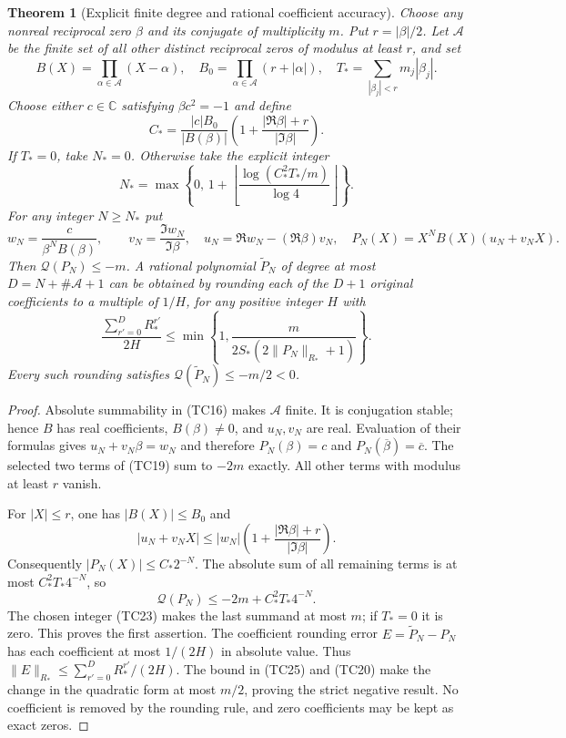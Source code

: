 \documentclass[11pt]{article}
\newtheorem{theorem}{Theorem}
\newcommand{\C}{\mathbb C}
\begin{document}
\begin{theorem}[Explicit finite degree and rational coefficient accuracy]
Choose any nonreal reciprocal zero $\beta$ and its conjugate of
multiplicity $m$. Put $r=|\beta|/2$. Let $\mathcal A$ be the finite
set of all other distinct reciprocal zeros of modulus at least
$r$, and set
\[
B(X)=\prod_{\alpha\in\mathcal A}(X-\alpha),\quad
B_0=\prod_{\alpha\in\mathcal A}(r+|\alpha|),\quad
T_*=\sum_{|\beta_j|<r}m_j|\beta_j|.
\tag{TC21}
\]
Choose either $c\in\C$ satisfying $\beta c^2=-1$ and define
\[
C_*=\frac{|c|B_0}{|B(\beta)|}
\left(1+\frac{|\Re\beta|+r}{|\Im\beta|}\right).
\tag{TC22}
\]
If $T_*=0$, take $N_*=0$. Otherwise take the explicit integer
\[
N_*=\max\left\{0,\,
1+\left\lfloor\frac{\log(C_*^2T_*/m)}{\log4}\right\rfloor\right\}.
\tag{TC23}
\]
For any integer $N\ge N_*$ put
\[
w_N=\frac{c}{\beta^NB(\beta)},\qquad
v_N=\frac{\Im w_N}{\Im\beta},\quad
u_N=\Re w_N-(\Re\beta)v_N,\quad
P_N(X)=X^NB(X)(u_N+v_NX).
\tag{TC24}
\]
Then $\mathcal Q(P_N)\le-m$. A rational polynomial
$\widetilde P_N$ of degree at most
$D=N+\#\mathcal A+1$ can be obtained by rounding each of the
$D+1$ original coefficients to a multiple of $1/H$, for any
positive integer $H$ with
\[
\frac{\sum_{r'=0}^D R_*^{r'}}{2H}
\le
\min\left\{1,\frac{m}{2S_*(2\|P_N\|_{R_*}+1)}\right\}.
\tag{TC25}
\]
Every such rounding satisfies
$\mathcal Q(\widetilde P_N)\le-m/2<0$.
\end{theorem}
\begin{proof}
Absolute summability in (TC16) makes $\mathcal A$ finite.
It is conjugation stable; hence $B$ has real coefficients,
$B(\beta)\ne0$, and $u_N,v_N$ are real. Evaluation of their
formulas gives $u_N+v_N\beta=w_N$ and therefore
$P_N(\beta)=c$ and $P_N(\overline\beta)=\overline c$.
The selected two terms of (TC19) sum to $-2m$ exactly.
All other terms with modulus at least $r$ vanish.

For $|X|\le r$, one has $|B(X)|\le B_0$ and
\[
|u_N+v_NX|
\le |w_N|\left(1+\frac{|\Re\beta|+r}{|\Im\beta|}\right).
\]
Consequently $|P_N(X)|\le C_*2^{-N}$. The absolute sum of
all remaining terms is at most $C_*^2T_*4^{-N}$, so
\[
\mathcal Q(P_N)\le-2m+C_*^2T_*4^{-N}.
\tag{TC26}
\]
The chosen integer (TC23) makes the last summand at most $m$;
if $T_*=0$ it is zero. This proves the first assertion.
The coefficient rounding error $E=\widetilde P_N-P_N$ has
each coefficient at most $1/(2H)$ in absolute value.
Thus $\|E\|_{R_*}\le\sum_{r'=0}^DR_*^{r'}/(2H)$.
The bound in (TC25) and (TC20) make the change in the quadratic
form at most $m/2$, proving the strict negative result.
No coefficient is removed by the rounding rule, and zero
coefficients may be kept as exact zeros.
\end{proof}
\end{document}
